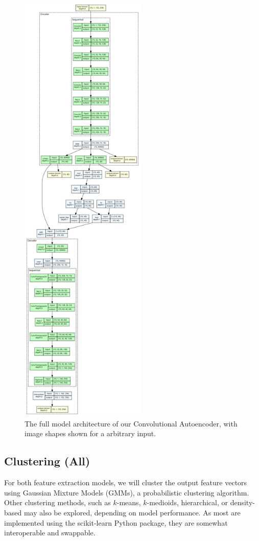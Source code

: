\documentclass[12pt]{article}
\begin{document}
\begin{figure}[h]
    \includegraphics[width=6cm]{modelpic.png}
    \centering
    \caption{The full model architecture of our Convolutional Autoencoder, with image shapes shown for a arbitrary input.}
\label{fig:CAE}
\end{figure}

\subsection{Clustering (All)}
For both feature extraction models, we will cluster the output feature vectors using Gaussian Mixture Models (GMMs), a probabilistic clustering algorithm.
Other clustering methods, such as $k$-means, $k$-medioids, hierarchical, or density-based may also be explored, depending on model performance. 
As most are implemented using the scikit-learn Python package, they are somewhat interoperable and swappable. 
\end{document}

